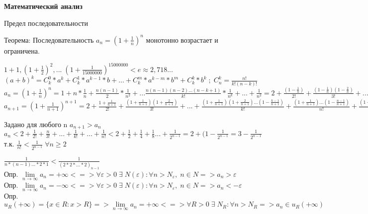 \documentclass[14pt,a4paper]{article}
\begin{document}
\textbf{Математический анализ}

Предел последовательности

Теорема: Последовательность $a_n= (1+ \frac{1}{n})^n$ монотонно возрастает и ограничена.

$ 1+1, (1+\frac{1}{2})^2, ... \; (1+\frac{1}{15000000})^{15000000} <  e \approx  2,718... $ \\

$ (a+b)^k = C^0_k * a^k + C^1_k * a^{k-1} * b + ... + C^m_k * a^{k-m} * b^m + C^k_k * b^k \; ; \; C^k_n = \frac{n!}{k!(n-k)!} $ \\

$a_n = (1+\frac{1}{n})^n 
= 1 +n * \frac{1}{n} + \frac{n(n-1)}{2} * \frac{1}{n^2} + ... \frac{n(n-1)(n-2) ...(n-k+1)}{k!} * \frac{1}{n^k} + ... + \frac{1}{n^2} 
= 2 + \frac{(1-\frac{1}{n})}{2!} +\frac{(1-\frac{1}{n})(1-\frac{2}{n})}{3!} + ... + \frac{(1-\frac 1n)(1 - \frac 2n)...(1-\frac{k-1}{n})}{k!} + ... + \frac{(1-\frac{1}{n})...(1-\frac{n-1}{n})}{n!} $ \\

$a_{n+1} = (1+\frac{1}{n+1})^{n+1} = 2 + \frac{1+\frac{1}{n+1}}{2!} + \frac{(1 + \frac{1}{n+1})(1 + \frac{2}{n+1})}{3!} + ... + \frac{(1+\frac{1}{n+1})(1+\frac{2}{n+1})...(1-\frac{k-1}{n+1})}{k!} + \frac{(1+\frac{1}{n+1})...(1-\frac{n-1}{n+1})}{n!} + \frac{(1 + \frac{1}{n+1})...(1+\frac{n}{n+1})}{(n+1)!} $

Задано для любого n $a_{n+1} > a_n $ \\ 

$a_n < 2 + \frac{1}{2!} + \frac{n}{3!} + ... + \frac{1}{k!} + ... +  \frac{1}{n!} < 2 + \frac 12 + \frac 14 + \frac 18 ... + \frac 1{2^{n-1}} = 2 + (1 - \frac {1}{2^{n-1}} = 3 - \frac{1}{2^{n-1}} $ т.к. $\frac{1}{n!} < \frac{1}{2^{n-1}} \; \forall n \ge  2 $

$\frac{1}{n*(n-1)...*2*1} < \frac{1}{(2*2*...*2)_{n-1}}$ \\

Опр. $\lim\limits_{n \rightarrow \infty} a_n = + \infty <=> \forall \varepsilon > 0 \; \exists \; N(\varepsilon) : \forall n>N_{\varepsilon}, \; n\in N => a_n > \varepsilon $ \\

Опр. $\lim\limits_{n \rightarrow \infty} a_n = - \infty <=> \forall \varepsilon > 0 \; \exists \; N(\varepsilon) : \forall n>N_{\varepsilon}, \; n\in N => a_n < - \varepsilon $ \\

Опр. $u_{R} (+\infty) = \{ x \in R : x>R \} => \lim\limits_{n \rightarrow \infty} a_n = + \infty <=> \forall R>0 \; \exists \; N_R : \forall n > N_R => a_n \in u_R (+\infty)$ \\
\end{document}
